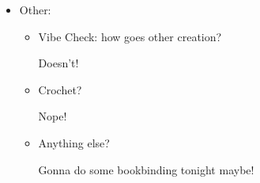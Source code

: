 \documentclass[12pt]{article}
\renewcommand{\,}{\textsuperscript{,}}
\begin{document}
\begin{itemize}
\begin{itemize}
\begin{itemize}
\begin{itemize}
\begin{itemize}
That is, take the full stitch design for the knot and add the stitches for the weave and background underneath.  
 \item Figure out action plan for stitching. \\ See \href{daily-reflection-2026-08-03}{this post} for most recent ideas.  
 \end{itemize}  
   
 \item Stitching: do. \\ See \href{daily-reflection-2026-08-03}{this post} for most recent ideas.

\end{itemize}  
 \item Future Embroidery Projects?  
 \begin{itemize}   
 \item Using variety of stitches for shaping   
 \item Using colors for transparency or to give the idea of light better   
 \item Representational (or non-non-representational to be honest to myself for thoughts) work   
 \item Smaller projects   
 \item Using whitespace better. Right now I have all designs as much thicker than one stitch.   
   
Lots of the major styles (blackwork and Assisi, for example) base a lot on single stitch design. Why don't we try some of that?   
 \end{itemize}  
 \end{itemize}  
   
 \item Other:  
 \begin{itemize}  
 \item Vibe Check: how goes other creation?

Doesn't!

\item Crochet?

Nope!

\item Anything else?

Gonna do some bookbinding tonight maybe!


\end{itemize}
\end{itemize}
\end{itemize}
\end{document}
